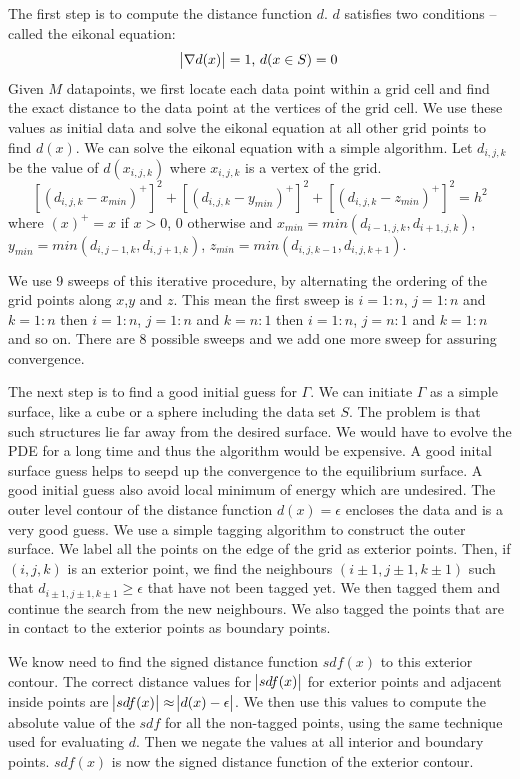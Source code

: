 \documentclass[a4paper]{article}
\begin{document}
The first step is to compute the distance function $d$. $d$ satisfies two conditions -- called the eikonal equation:
$$\abs{\nabla d(x)} = 1\text{, }d(x\in S) = 0$$
Given $M$ datapoints, we first locate each data point within a grid cell and find the exact distance to the data point at the vertices of the grid cell. We use these values as initial data and solve the eikonal equation at all other grid points to find $d(x)$. We can solve the eikonal equation with a simple algorithm. Let $d_{i,j,k}$ be the value of $d(x_{i,j,k})$ where $x_{i,j,k}$ is a vertex of the grid.
$$[(d_{i,j,k} - x_{min})^+]^2 + [(d_{i,j,k} - y_{min})^+]^2 + [(d_{i,j,k} - z_{min})^+]^2 = h^2$$
where $(x)^+ = x$ if $x > 0$, $0$ otherwise and $x_{min} = min(d_{i-1,j,k}, d_{i+1,j,k})$, $y_{min} = min(d_{i,j-1,k}, d_{i,j+1,k})$, $z_{min} = min(d_{i,j,k-1}, d_{i,j,k+1})$.

We use 9 sweeps of this iterative procedure, by alternating the ordering of the grid points along $x$,$y$ and $z$. This mean the first sweep is $i=1:n$, $j=1:n$ and $k=1:n$ then $i=1:n$, $j=1:n$ and $k=n:1$ then $i=1:n$, $j=n:1$ and $k=1:n$ and so on. There are 8 possible sweeps and we add one more sweep for assuring convergence.

The next step is to find a good initial guess for $\Gamma$. We can initiate $\Gamma$ as a simple surface, like a cube or a sphere including the data set $S$. The problem is that such structures lie far away from the desired surface. We would have to evolve the PDE for a long time and thus the algorithm would be expensive. A good inital surface guess helps to seepd up the convergence to the equilibrium surface. A good initial guess also avoid local minimum of energy which are undesired. The outer level contour of the distance function $d(x) = \epsilon$ encloses the data and is a very good guess. We use a simple tagging algorithm to construct the outer surface. We label all the points on the edge of the grid as exterior points. Then, if $(i,j,k)$ is an exterior point, we find the neighbours $(i\pm 1,j\pm 1,k\pm 1)$ such that $d_{i\pm 1,j\pm 1,k\pm 1} \geq \epsilon$ that have not been tagged yet. We then tagged them and continue the search from the new neighbours. We also tagged the points that are in contact to the exterior points as boundary points.

We know need to find the signed distance function $sdf(x)$ to this exterior contour. The correct distance values for $\abs{sdf(x)}$ for exterior points and adjacent inside points are $\abs{sdf(x)} \approx \abs{d(x) - \epsilon}$. We then use this values to compute the absolute value of the $sdf$ for all the non-tagged points, using the same technique used for evaluating $d$. Then we negate the values at all interior and boundary points. $sdf(x)$ is now the signed distance function of the exterior contour.
\end{document}
